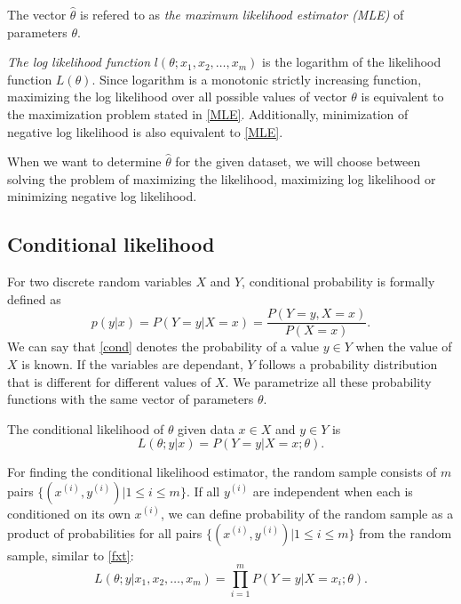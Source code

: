 \documentclass[times, utf8, zavrsni]{fer}
\begin{document}
The vector $\hat\theta$ is refered to as \emph{the maximum likelihood estimator (MLE)} of parameters $\theta$. 

\emph{The log likelihood function} $l(\theta; x_1, x_2, \dots, x_m)$ is the logarithm of the likelihood function $L(\theta)$. Since logarithm is a monotonic strictly increasing function, maximizing the log likelihood over all possible values of vector $\theta$ is equivalent to the maximization problem stated in \eqref{MLE}. Additionally, minimization of negative log likelihood is also equivalent to \eqref{MLE}.

When we want to determine $\hat\theta$ for the given dataset, we will choose between solving the problem of maximizing the likelihood, maximizing log likelihood or minimizing negative log likelihood.

\subsection{Conditional likelihood}

For two discrete random variables $X$ and $Y$, conditional probability is formally defined as 
\begin{equation}
\label{cond}
	p(y | x) = P(Y = y | X = x) = \frac{P(Y = y, X = x)}{P(X = x)}. 
\end{equation}
We can say that \eqref{cond} denotes the probability of a value $y \in Y$ when the value of $X$ is known. If the variables are dependant, $Y$ follows a probability distribution that is different for different values of $X$. We parametrize all these probability functions with the same vector of parameters $\theta$.

The conditional likelihood of $\theta$ given data $x \in X$ and $y \in Y$ is 
\begin{equation}
	L(\theta;y | x) = P(Y = y | X = x; \theta ).
\end{equation}

For finding the conditional likelihood estimator, the random sample consists of $m$  pairs $\{(x^{(i)}, y^{(i)}) | 1 \le i \le m\}$. If  all $y^{(i)}$ are independent when each is conditioned on its own $x^{(i)}$, we can define probability of the random sample as a product of probabilities for all pairs $\{(x^{(i)}, y^{(i)}) | 1 \le i \le m\}$ from the random sample, similar to \eqref{fxt}:
\begin{equation}
\label{fxt2}
 L(\theta; y | x_1, x_2, \dots, x_m) = \prod_{i=1}^{m}{P(Y = y | X = x_i;\theta)}    . 
\end{equation}
\end{document}
